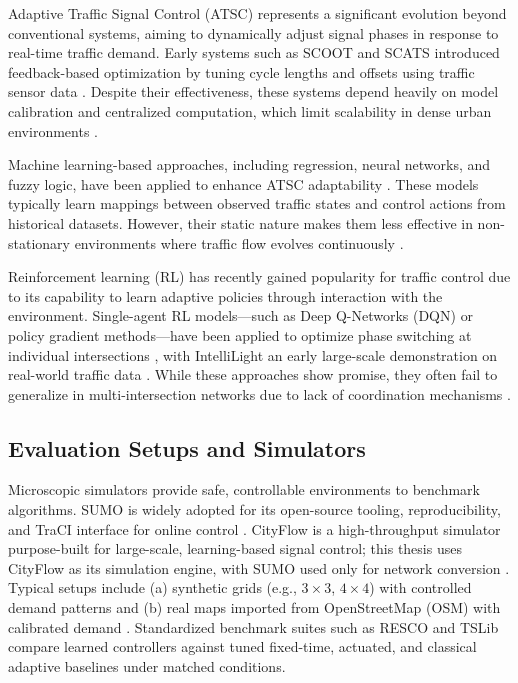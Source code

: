 \documentclass[12pt]{report} %
\begin{document}
Adaptive Traffic Signal Control (ATSC) represents a significant evolution beyond conventional systems, aiming to dynamically adjust signal phases in response to real-time traffic demand. Early systems such as SCOOT and SCATS introduced feedback-based optimization by tuning cycle lengths and offsets using traffic sensor data \cite{SCOOT2020,SCATS2021}. Despite their effectiveness, these systems depend heavily on model calibration and centralized computation, which limit scalability in dense urban environments \cite{AdaptiveReview_2023}.

Machine learning-based approaches, including regression, neural networks, and fuzzy logic, have been applied to enhance ATSC adaptability \cite{MLTraffic2022,FuzzyTraffic2021,DeepTraffic2023}. These models typically learn mappings between observed traffic states and control actions from historical datasets. However, their static nature makes them less effective in non-stationary environments where traffic flow evolves continuously \cite{ITS2022_Overview}.

Reinforcement learning (RL) has recently gained popularity for traffic control due to its capability to learn adaptive policies through interaction with the environment. Single-agent RL models—such as Deep Q-Networks (DQN) \cite{Mnih_2015} or policy gradient methods—have been applied to optimize phase switching at individual intersections \cite{DQN_Traffic2022,PolicyGradient2023}, with IntelliLight an early large-scale demonstration on real-world traffic data \cite{Wei_2018}. While these approaches show promise, they often fail to generalize in multi-intersection networks due to lack of coordination mechanisms \cite{IQLTraffic2021,CooperativeRL2022}.

\subsection*{Evaluation Setups and Simulators}
Microscopic simulators provide safe, controllable environments to benchmark algorithms. SUMO is widely adopted for its open-source tooling, reproducibility, and TraCI interface for online control \cite{Lopez_2018}. CityFlow is a high-throughput simulator purpose-built for large-scale, learning-based signal control; this thesis uses CityFlow as its simulation engine, with SUMO used only for network conversion \cite{CityFlow_2019,SimulationPlatforms_Comparison2023}. Typical setups include (a) synthetic grids (e.g., $3\times3$, $4\times4$) with controlled demand patterns and (b) real maps imported from OpenStreetMap (OSM) with calibrated demand \cite{OSM_SUMO_2022}. Standardized benchmark suites such as RESCO \cite{RESCO_2021} and TSLib \cite{Tran_TSLib_2021} compare learned controllers against tuned fixed-time, actuated, and classical adaptive baselines under matched conditions.
\end{document}
